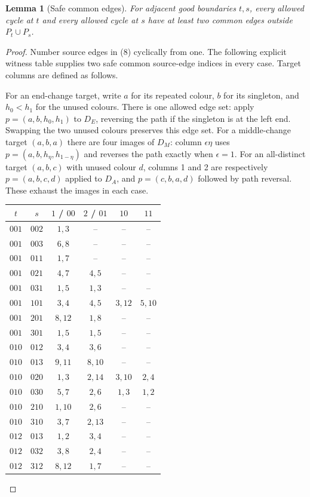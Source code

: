 \documentclass[11pt]{article}
\newtheorem{lemma}[theorem]{Lemma}
\theoremstyle{remark}
\numberwithin{equation}{section}
\begin{document}
\begin{lemma}[Safe common edges]\label{lem:pathsafe}
For adjacent good boundaries $t,s$, every allowed cycle at $t$ and
every allowed cycle at $s$ have at least two common edges outside
$P_t\cup P_s$.
\end{lemma}
\begin{proof}
Number source edges in (8) cyclically from one. The following explicit
witness table supplies two safe common source-edge indices in every
case. Target columns are defined as follows.

For an end-change target, write $a$ for its repeated colour, $b$ for
its singleton, and $h_0<h_1$ for the unused colours. There is one
allowed edge set: apply $p=(a,b,h_0,h_1)$ to $D_E$, reversing the path
if the singleton is at the left end. Swapping the two unused colours
preserves this edge set.
For a middle-change target $(a,b,a)$ there are four images of $D_M$:
column $\epsilon\eta$ uses $p=(a,b,h_\eta,h_{1-\eta})$ and reverses
the path exactly when $\epsilon=1$. For an all-distinct target
$(a,b,c)$ with unused colour $d$, columns 1 and 2 are respectively
$p=(a,b,c,d)$ applied to $D_A$, and $p=(c,b,a,d)$ followed by path
reversal. These exhaust the images in each case.
\begin{center}\small
\begin{tabular}{cc|cccc}
$t$ & $s$ & $1$ / $00$ & $2$ / $01$ & $10$ & $11$\\\hline
$001$ & $002$ & $1,3$ & -- & -- & --\\
$001$ & $003$ & $6,8$ & -- & -- & --\\
$001$ & $011$ & $1,7$ & -- & -- & --\\
$001$ & $021$ & $4,7$ & $4,5$ & -- & --\\
$001$ & $031$ & $1,5$ & $1,3$ & -- & --\\
$001$ & $101$ & $3,4$ & $4,5$ & $3,12$ & $5,10$\\
$001$ & $201$ & $8,12$ & $1,8$ & -- & --\\
$001$ & $301$ & $1,5$ & $1,5$ & -- & --\\
$010$ & $012$ & $3,4$ & $3,6$ & -- & --\\
$010$ & $013$ & $9,11$ & $8,10$ & -- & --\\
$010$ & $020$ & $1,3$ & $2,14$ & $3,10$ & $2,4$\\
$010$ & $030$ & $5,7$ & $2,6$ & $1,3$ & $1,2$\\
$010$ & $210$ & $1,10$ & $2,6$ & -- & --\\
$010$ & $310$ & $3,7$ & $2,13$ & -- & --\\
$012$ & $013$ & $1,2$ & $3,4$ & -- & --\\
$012$ & $032$ & $3,8$ & $2,4$ & -- & --\\
$012$ & $312$ & $8,12$ & $1,7$ & -- & --\\
\end{tabular}
\end{center}


\end{proof}
\end{document}
